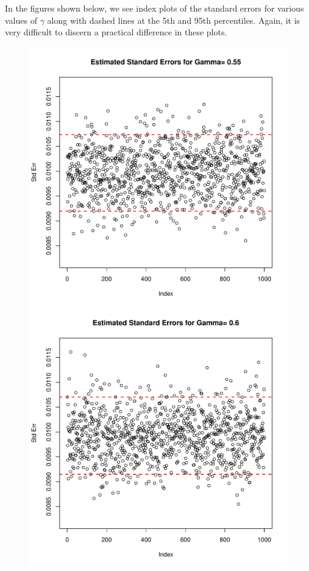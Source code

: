 \documentclass[a4paper, 11pt]{report}
\begin{document}
\begin{enumerate}
			In the figures shown below, we see index plots of the standard errors for various values of $\gamma$ along with dashed lines at the 5th and 95th percentiles.  Again, it is very difficult to discern a practical difference in these plots.	    
			\begin{figure}[H]
				\centering
				\includegraphics[scale=0.50]{index_plot_se_s5_r50_g55.pdf}
				\includegraphics[scale=0.50]{index_plot_se_s5_r50_g60.pdf} \\						

\end{figure}
\end{enumerate}
\end{document}
